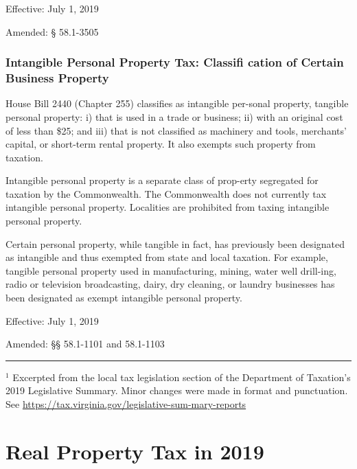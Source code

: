 \documentclass[
]{book}
\begin{document}
Effective: July 1, 2019

Amended: § 58.1-3505

\hypertarget{intangible-personal-property-tax-classifi-cation-of-certain-business-property}{%
\subsection{Intangible Personal Property Tax: Classifi cation of Certain Business Property}\label{intangible-personal-property-tax-classifi-cation-of-certain-business-property}}

House Bill 2440 (Chapter 255) classifies as intangible per-sonal property, tangible personal property: i) that is used in a trade or business; ii) with an original cost of less than \$25; and iii) that is not classified as machinery and tools, merchants' capital, or short-term rental property. It also exempts such property from taxation.

Intangible personal property is a separate class of prop-erty segregated for taxation by the Commonwealth. The Commonwealth does not currently tax intangible personal property. Localities are prohibited from taxing intangible personal property.

Certain personal property, while tangible in fact, has previously been designated as intangible and thus exempted from state and local taxation. For example, tangible personal property used in manufacturing, mining, water well drill-ing, radio or television broadcasting, dairy, dry cleaning, or laundry businesses has been designated as exempt intangible personal property.

Effective: July 1, 2019

Amended: §§ 58.1-1101 and 58.1-1103

\begin{center}\rule{0.5\linewidth}{0.5pt}\end{center}

\(^1\) Excerpted from the local tax legislation section of the Department of Taxation's 2019 Legislative Summary. Minor changes were made in format and punctuation. See \url{https://tax.virginia.gov/legislative-sum-mary-reports}

\hypertarget{real-property-tax-in-2019}{%
\chapter{Real Property Tax in 2019}\label{real-property-tax-in-2019}}
\end{document}

